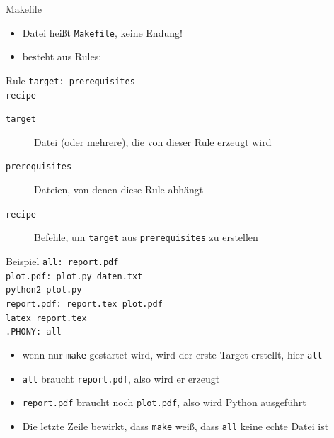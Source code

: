 \begin{frame}{Makefile}
  \begin{itemize}
    \item Datei heißt \texttt{Makefile}, keine Endung!
    \item besteht aus Rules:
  \end{itemize}
  \begin{block}{Rule}
    \texttt{target: prerequisites\\
    \hspace{1cm} recipe}
  \end{block}
  \begin{description}
    \item[\texttt{target}] Datei (oder mehrere), die von dieser Rule erzeugt wird
    \item[\texttt{prerequisites}] Dateien, von denen diese Rule abhängt
    \item[\texttt{recipe}] Befehle, um \texttt{target} aus \texttt{prerequisites} zu erstellen
  \end{description}
\end{frame}

\begin{frame}{Beispiel}
  \texttt{all: report.pdf\\[0.5cm]
    plot.pdf: plot.py daten.txt\\
    \hspace{1cm} python2 plot.py\\[0.5cm]
    report.pdf: report.tex plot.pdf\\
    \hspace{1cm} latex report.tex\\[0.5cm]
    .PHONY: all
  }

  \begin{itemize}
    \item wenn nur \texttt{make} gestartet wird, wird der erste Target erstellt, hier \texttt{all}
    \item \texttt{all} braucht \texttt{report.pdf}, also wird er erzeugt
    \item \texttt{report.pdf} braucht noch \texttt{plot.pdf}, also wird Python ausgeführt
    \item Die letzte Zeile bewirkt, dass \texttt{make} weiß, dass \texttt{all} keine echte Datei ist
  \end{itemize}
\end{frame}
